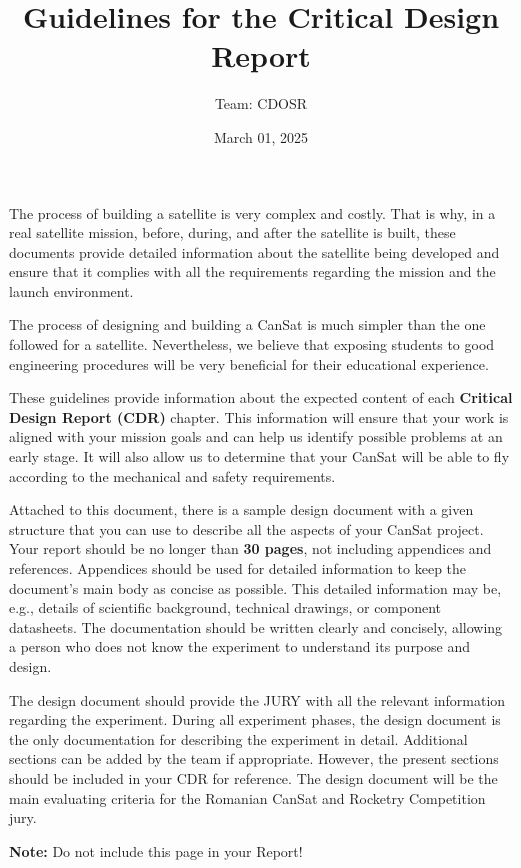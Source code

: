 \documentclass[11pt]{article}
\title{Guidelines for the Critical Design Report
}
\author{Team: CDOSR}
\date{March 01, 2025}
\begin{document}



The process of building a satellite is very complex and costly. That is why, in a real satellite mission, before, during, and after the satellite is built, these documents provide detailed information about the satellite being developed and ensure that it complies with all the requirements regarding the mission and the launch environment.

The process of designing and building a CanSat is much simpler than the one followed for a satellite. Nevertheless, we believe that exposing students to good engineering procedures will be very beneficial for their educational experience.

These guidelines provide information about the expected content of each \textbf{Critical Design Report (CDR)} chapter. 
This information will ensure that your work is aligned with your mission goals and can help us identify possible problems at an early stage. 
It will also allow us to determine that your CanSat will be able to fly according to the mechanical and safety requirements.

Attached to this document, there is a sample design document with a given structure that you can use to describe all the aspects of your CanSat project. 
Your report should be no longer than \textbf{30 pages}, not including appendices and references. Appendices should be used for detailed information 
to keep the document's main body as concise as possible. This detailed information may be, e.g., details of scientific background, technical drawings, or 
component datasheets. The documentation should be written clearly and concisely, allowing a person who does not know the experiment to understand its purpose and design.

The design document should provide the JURY with all the relevant information regarding the experiment. 
During all experiment phases, the design document is the only documentation for describing the experiment in detail. 
Additional sections can be added by the team if appropriate. However, the present sections should be included in your CDR for reference. The design document will be the main evaluating criteria for the Romanian CanSat and Rocketry Competition jury.

\vspace{3cm}
{\Large{\textbf{Note:} Do not include this page in your Report!}}
\end{document}
